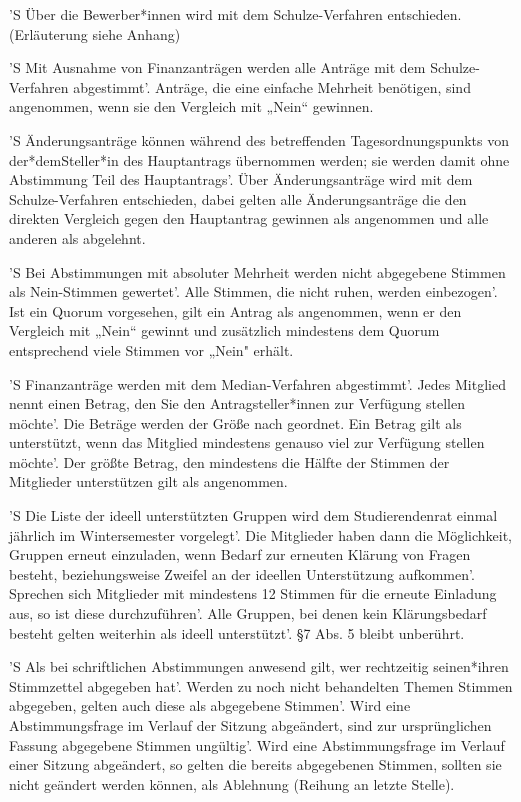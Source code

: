 \documentclass[fontsize=12pt,parskip=half, ref=short]{scrartcl}
\begin{document}
\begin{contract}
  \label{Par:Wahlver}
  'S Über die Bewerber*innen wird mit dem Schulze-Verfahren entschieden.
  (Erläuterung siehe Anhang) 

  \label{Par:OrdAbstimmv}
  'S Mit Ausnahme  von Finanzanträgen  werden alle  Anträge  mit  dem
  Schulze-Verfahren abgestimmt'. Anträge, die eine einfache Mehrheit benötigen,
  sind angenommen, wenn sie den Vergleich mit „Nein“ gewinnen.

  'S Änderungsanträge können während des betreffenden Tagesordnungspunkts von
  der*demSteller*in des Hauptantrags übernommen werden; sie werden damit ohne
  Abstimmung Teil des Hauptantrags'. Über Änderungsanträge wird mit dem
  Schulze-Verfahren entschieden, dabei gelten alle Änderungsanträge die den
  direkten Vergleich gegen den Hauptantrag gewinnen als angenommen und alle
  anderen als abgelehnt.

  'S Bei Abstimmungen mit absoluter Mehrheit werden nicht abgegebene Stimmen als
  Nein-Stimmen gewertet'. Alle Stimmen, die nicht ruhen, werden einbezogen'. Ist
  ein Quorum vorgesehen, gilt ein Antrag als angenommen, wenn er den Vergleich
  mit „Nein“ gewinnt und zusätzlich mindestens dem Quorum entsprechend viele
  Stimmen vor „Nein" erhält.

  'S Finanzanträge werden mit dem Median-Verfahren abgestimmt'. Jedes Mitglied
  nennt einen Betrag, den Sie den Antragsteller*innen zur Verfügung stellen
  möchte'. Die Beträge werden der Größe nach geordnet. Ein Betrag gilt als
  unterstützt, wenn das Mitglied mindestens genauso viel zur Verfügung stellen
  möchte'. Der größte Betrag, den mindestens die Hälfte der Stimmen der
  Mitglieder unterstützen gilt als angenommen.

  'S Die Liste der ideell unterstützten Gruppen wird dem Studierendenrat einmal
  jährlich im Wintersemester vorgelegt'. Die Mitglieder haben dann die
  Möglichkeit, Gruppen erneut einzuladen, wenn Bedarf zur erneuten Klärung von
  Fragen besteht, beziehungsweise Zweifel an der ideellen Unterstützung
  aufkommen'. Sprechen sich Mitglieder mit mindestens 12 Stimmen für die erneute
  Einladung aus, so ist diese durchzuführen'. Alle Gruppen, bei denen kein
  Klärungsbedarf besteht gelten weiterhin als ideell unterstützt'. §7 Abs. 5
  bleibt unberührt.

  'S Als bei schriftlichen Abstimmungen anwesend gilt, wer rechtzeitig
  seinen*ihren Stimmzettel abgegeben hat'. Werden zu noch nicht behandelten
  Themen Stimmen abgegeben, gelten auch diese als abgegebene Stimmen'. Wird eine
  Abstimmungsfrage im Verlauf der Sitzung abgeändert, sind zur ursprünglichen
  Fassung abgegebene Stimmen ungültig'. Wird eine Abstimmungsfrage im Verlauf
  einer Sitzung abgeändert, so gelten die bereits abgegebenen Stimmen, sollten
  sie nicht geändert werden können, als Ablehnung (Reihung an letzte Stelle).


\end{contract}
\end{document}
